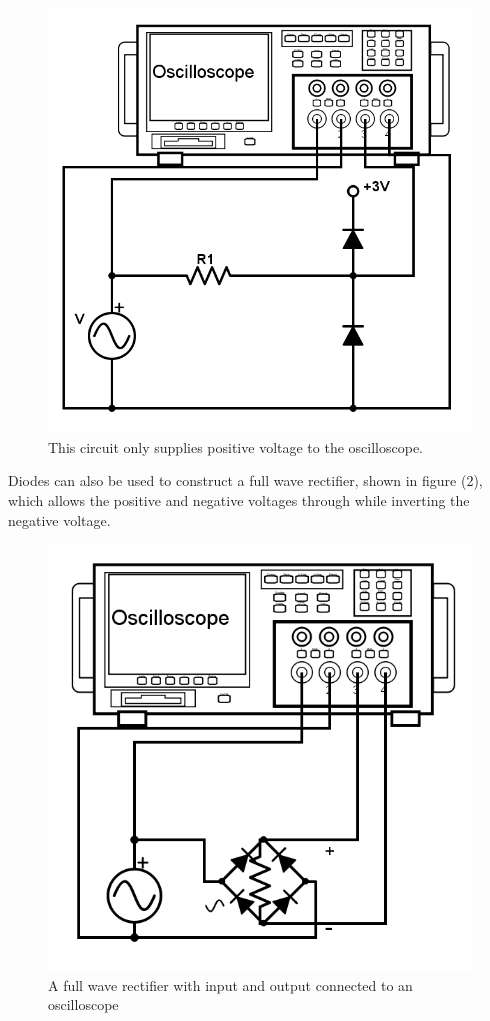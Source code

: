 \documentclass[twocolumn, amsmath]{revtex4}
\begin{document}
\begin{figure}
    \includegraphics[scale=0.25]{halfwave.png}  
    \caption{This circuit only supplies positive voltage to the oscilloscope.}
\end{figure}

Diodes can also be used to construct a full wave rectifier, shown in figure (2), which allows the positive and negative voltages through while inverting the negative voltage.

\begin{figure}
    \includegraphics[scale=0.3]{bridge.png}  
    \caption{A full wave rectifier with input and output connected to an oscilloscope}
\end{figure}
\end{document}
